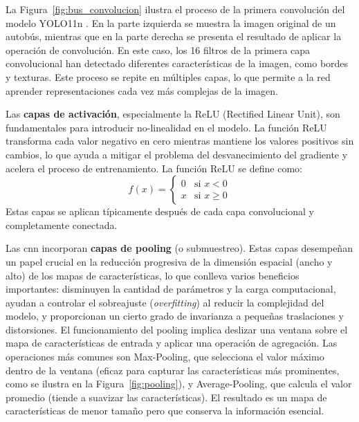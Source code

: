 \documentclass[11pt,spanish,listoffigures,listoftables]{tfgetsinf}
\begin{document}
La Figura~\ref{fig:bus_convolucion} ilustra el proceso de la primera convolución del modelo YOLO11n \cite{yolo11_ultralytics}. En la parte izquierda se muestra la imagen original de un autobús, mientras que en la parte derecha se presenta el resultado de aplicar la operación de convolución. En este caso, los 16 filtros de la primera capa convolucional han detectado diferentes características de la imagen, como bordes y texturas. Este proceso se repite en múltiples capas, lo que permite a la red aprender representaciones cada vez más complejas de la imagen.

Las \textbf{capas de activación}, especialmente la ReLU (Rectified Linear Unit), son fundamentales para introducir no-linealidad en el modelo. La función ReLU transforma cada valor negativo en cero mientras mantiene los valores positivos sin cambios, lo que ayuda a mitigar el problema del desvanecimiento del gradiente y acelera el proceso de entrenamiento. La función ReLU se define como:
\begin{equation}
   f(x) = \begin{cases}
      0 & \text{si } x < 0 \\
      x & \text{si } x \geq 0
   \end{cases}
\end{equation}
Estas capas se aplican típicamente después de cada capa convolucional y completamente conectada.

Las \gls{cnn} incorporan \textbf{capas de pooling} (o submuestreo). Estas capas desempeñan un papel crucial en la reducción progresiva de la dimensión espacial (ancho y alto) de los mapas de características, lo que conlleva varios beneficios importantes: disminuyen la cantidad de parámetros y la carga computacional, ayudan a controlar el sobreajuste (\textit{overfitting}) al reducir la complejidad del modelo, y proporcionan un cierto grado de invarianza a pequeñas traslaciones y distorsiones. El funcionamiento del pooling implica deslizar una ventana sobre el mapa de características de entrada y aplicar una operación de agregación. Las operaciones más comunes son Max-Pooling, que selecciona el valor máximo dentro de la ventana (eficaz para capturar las características más prominentes, como se ilustra en la Figura~\ref{fig:pooling}), y Average-Pooling, que calcula el valor promedio (tiende a suavizar las características). El resultado es un mapa de características de menor tamaño pero que conserva la información esencial.
\end{document}
